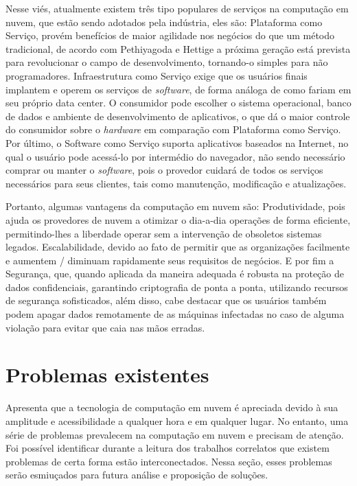 \documentclass[12pt]{article}
\begin{document}
Nesse viés, atualmente existem três tipo populares de serviços na computação em nuvem, que estão sendo adotados pela indústria, eles são: Plataforma como Serviço, provém benefícios de maior agilidade nos negócios do que um método tradicional, de acordo com Pethiyagoda e Hettige a próxima geração está prevista para revolucionar o campo de desenvolvimento, tornando-o simples para não programadores. Infraestrutura como Serviço exige que os usuários finais implantem e operem os serviços de \emph{software}, de forma análoga de como fariam em seu próprio data center. O consumidor pode escolher o sistema operacional, banco de dados e ambiente de desenvolvimento de aplicativos, o que dá o maior controle do consumidor sobre o \emph{hardware} em comparação com Plataforma como Serviço. Por último, o Software como Serviço suporta aplicativos baseados na Internet, no qual o usuário pode acessá-lo por intermédio do navegador, não sendo necessário comprar ou manter o \emph{software}, pois o provedor cuidará de todos os serviços necessários para seus clientes, tais como manutenção, modificação e atualizações.

Portanto, algumas vantagens da computação em nuvem são: Produtividade, pois ajuda os provedores de nuvem a otimizar o dia-a-dia operações de forma eficiente, permitindo-lhes a liberdade operar sem a intervenção de obsoletos sistemas legados. Escalabilidade, devido ao fato de permitir que as organizações facilmente e aumentem / diminuam rapidamente seus requisitos de negócios. E por fim a Segurança, que, quando aplicada da maneira adequada é robusta na proteção de dados confidenciais, garantindo criptografia de ponta a ponta, utilizando recursos de segurança sofisticados, além disso, cabe destacar que os usuários também podem apagar dados remotamente de as máquinas infectadas no caso de alguma violação para evitar que caia nas mãos erradas\cite{rani}.

\section{Problemas existentes}
\cite{rani} Apresenta que a tecnologia de computação em nuvem é apreciada devido à sua amplitude e acessibilidade a qualquer hora e em qualquer lugar. No entanto, uma série de problemas prevalecem na computação em nuvem e precisam de atenção. Foi possível identificar durante a leitura dos trabalhos correlatos que existem problemas de certa forma estão interconectados. Nessa seção, esses problemas serão esmiuçados para futura análise e proposição de soluções.
\end{document}
